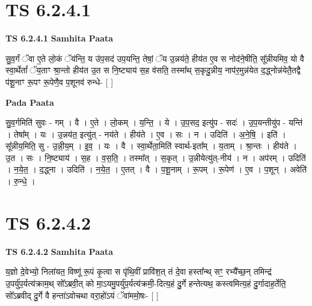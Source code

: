 \documentclass[17pt]{extarticle}
\begin{document}

\section{ TS 6.2.4.1 }

\textbf{TS 6.2.4.1 } \newline
\textbf{Samhita Paata} \newline

सु॒व॒र्गं ॅवा ए॒ते लो॒कं ॅय॑न्ति॒ य उ॑प॒सद॑ उप॒यन्ति॒ तेषां॒ ॅय उ॒न्नय॑ते॒ हीय॑त ए॒व स नोद॑ने॒षीति॒ सू᳚न्नीयमिव॒ यो वै स्वा॒र्थेतां᳚ ॅय॒ताꣳ श्रा॒न्तो हीय॑त उ॒त स नि॒ष्ट्याय॑ स॒ह व॑सति॒ तस्मा᳚थ् स॒कृदु॒न्नीय॒ नाप॑र॒मुन्न॑येत द॒द्ध्नोन्न॑येतै॒तद्वै प॑शू॒नाꣳ रू॒पꣳ रू॒पेणै॒व प॒शूनव॑ रुन्धे- [  ] \newline

\textbf{Pada Paata} \newline

सु॒व॒र्गमिति॑ सुवः - गम् । वै । ए॒ते । लो॒कम् । य॒न्ति॒ । ये । उ॒प॒सद॒ इत्यु॑प - सदः॑ । उ॒प॒यन्तीयु॑प - यन्ति॑ । तेषा᳚म् । यः । उ॒न्नय॑त॒ इत्यु॑त् - नय॑ते । हीय॑ते । ए॒व । सः । न । उदिति॑ । अ॒ने॒षि॒ । इति॑ । सू᳚न्नीय॒मिति॒ सु - उ॒न्नी॒य॒म् । इ॒व॒ । यः । वै । स्वा॒र्थेता॒मिति॑ स्वार्थ-इता᳚म् । य॒ताम् । श्रा॒न्तः । हीय॑ते । उ॒त । सः । नि॒ष्ट्याय॑ । स॒ह । व॒स॒ति॒ । तस्मा᳚त् । स॒कृत् । उ॒न्नीयेत्यु॑त्-नीय॑ । न । अप॑रम् । उदिति॑ । न॒ये॒त॒ । द॒द्ध्ना । उदिति॑ । न॒ये॒त॒ । ए॒तत् । वै । प॒शू॒नाम् । रू॒पम् । रू॒पेण॑ । ए॒व । प॒शून् । अवेति॑ । रु॒न्धे॒ ।  \newline





\section{ TS 6.2.4.2 }

\textbf{TS 6.2.4.2 } \newline
\textbf{Samhita Paata} \newline

य॒ज्ञो दे॒वेभ्यो॒ निला॑यत॒ विष्णू॑ रू॒पं कृ॒त्वा स पृ॑थि॒वीं प्रावि॑श॒त् तं दे॒वा हस्ता᳚न्थ् सꣳ॒॒ रभ्यै᳚च्छ॒न् तमिन्द्र॑ उ॒पर्यु॑प॒र्यत्य॑क्राम॒थ् सो᳚ऽब्रवी॒त् को मा॒ऽयमु॒पर्यु॑प॒र्यत्य॑क्रमी॒-दित्य॒हं दु॒र्गे हन्तेत्यथ॒ कस्त्वमित्य॒हं दु॒र्गादाह॒र्तेति॒ सो᳚ऽब्रवीद् दु॒र्गे वै हन्ता॑ऽवोचथा वरा॒हो॑ऽयं ॅवा॑ममो॒षः- [  ] \newline
\end{document}
